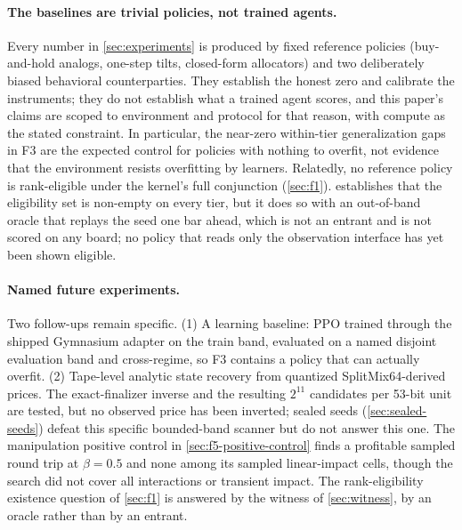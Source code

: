 \paragraph{The baselines are trivial policies, not trained agents.} Every number in \cref{sec:experiments} is produced by fixed reference policies (buy-and-hold analogs, one-step tilts, closed-form allocators) and two deliberately biased behavioral counterparties. They establish the honest zero and calibrate the instruments; they do not establish what a trained agent scores, and this paper's claims are scoped to environment and protocol for that reason, with compute as the stated constraint. In particular, the near-zero within-tier generalization gaps in F3 are the expected control for policies with nothing to overfit, not evidence that the environment resists overfitting by learners. Relatedly, no reference policy is rank-eligible under the kernel's full conjunction (\cref{sec:f1}).  establishes that the eligibility set is non-empty on every tier, but it does so with an out-of-band oracle that replays the seed one bar ahead, which is not an entrant and is not scored on any board; no policy that reads only the observation interface has yet been shown eligible.

\paragraph{Named future experiments.} Two follow-ups remain specific. (1) A learning baseline: PPO trained through the shipped Gymnasium adapter on the train band, evaluated on a named disjoint evaluation band and cross-regime, so F3 contains a policy that can actually overfit. (2) Tape-level analytic state recovery from quantized SplitMix64-derived prices. The exact-finalizer inverse and the resulting $2^{11}$ candidates per 53-bit unit are tested, but no observed price has been inverted; sealed seeds (\cref{sec:sealed-seeds}) defeat this specific bounded-band scanner but do not answer this one. The manipulation positive control in \cref{sec:f5-positive-control} finds a profitable sampled round trip at $\beta = 0.5$ and none among its sampled linear-impact cells, though the search did not cover all interactions or transient impact. The rank-eligibility existence question of \cref{sec:f1} is answered by the witness of \cref{sec:witness}, by an oracle rather than by an entrant.

